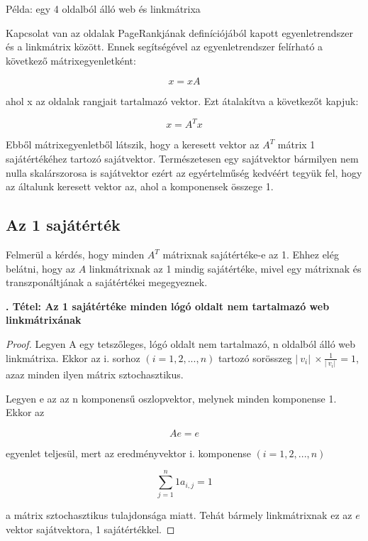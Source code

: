 \documentclass[12pt,a4paper]{article}
\newcounter{tszam}
\newenvironment{tetel}[1]
{{\medskip}\noindent \stepcounter{tszam}
{\bfseries{\thetszam. Tétel: #1\\[1ex]}}}{\bigskip }
\begin{document}
\bigskip
\centerline{Példa: egy 4 oldalból álló web és linkmátrixa}
\bigskip

Kapcsolat van az oldalak PageRankjának definíciójából kapott egyenletrendszer és a linkmátrix között. Ennek segítségével az egyenletrendszer felírható a következő mátrixegyenletként:

\[ x = x A \]

ahol x az oldalak rangjait tartalmazó vektor. Ezt átalakítva a következőt kapjuk:

\[ x = A^T x \]

Ebből mátrixegyenletből látszik, hogy a keresett vektor az $A^T$ mátrix 1 sajátértékéhez tartozó sajátvektor. Természetesen egy sajátvektor bármilyen nem nulla skalárszorosa is sajátvektor ezért az egyértelműség kedvéért tegyük fel, hogy az általunk keresett vektor az, ahol a komponensek összege 1.

\subsection{Az 1 sajátérték}\label{egy_sajatertek}

Felmerül a kérdés, hogy minden $A^T$ mátrixnak sajátértéke-e az 1. Ehhez elég belátni, hogy az $A$ linkmátrixnak az 1 mindig sajátértéke, mivel egy mátrixnak és transzponáltjának a sajátértékei megegyeznek.

\begin{tetel}{Az 1 sajátértéke minden lógó oldalt nem tartalmazó web linkmátrixának}
\end{tetel}
\begin{proof}
	Legyen A egy tetszőleges, lógó oldalt nem tartalmazó, n oldalból álló web linkmátrixa. Ekkor az i. sorhoz $(i = 1,2,...,n)$ tartozó sorösszeg $ |\ v_i |\ \times \frac{1}{|\ v_i |\ } = 1 $, azaz minden ilyen mátrix sztochasztikus.
	
	Legyen e az az n komponensű oszlopvektor, melynek minden komponense 1. Ekkor az
	
	\[ A e = e \] 
	
	egyenlet teljesül, mert az eredményvektor i. komponense $(i = 1,2,...,n)$
	
	\[ \sum_{j=1}^{n}{1 a_{i,j} } = 1 \] 
	
	a mátrix sztochasztikus tulajdonsága miatt. Tehát bármely linkmátrixnak ez az $e$ vektor sajátvektora, 1 sajátértékkel.
	
\end{proof}
\vspace{0.5cm}
\end{document}
